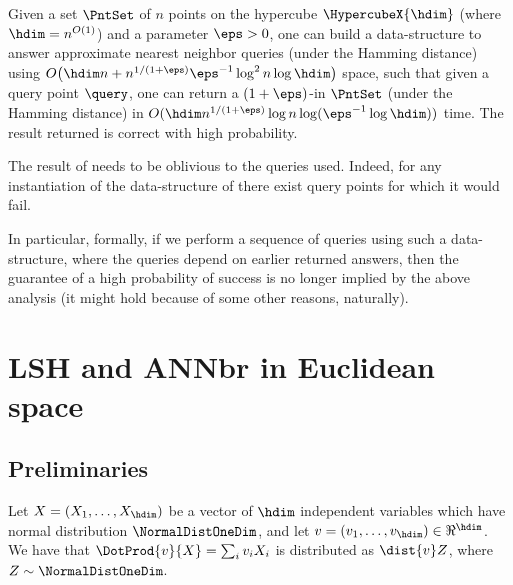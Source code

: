 \begin{theorem}
    Given a set $\PntSet$ of $n$ points on the hypercube
    $\HypercubeX{\hdim}$ (where $\hdim = n^{O(1)}$) and a parameter
    $\eps>0$, one can build a data-structure to answer approximate
    nearest neighbor queries (under the Hamming distance) using
    \begin{math}
        O\bigl( \hdim n + { n^{1/(1+\eps)}}\eps^{-1} \log^2 n \log
        \hdim \bigr)
    \end{math}
    space, such that given a query point $\query$, one can return
    a $(1+\eps)$-\ANNbr in $\PntSet$ (under the Hamming distance) in
    $O( \hdim n^{1/(1+\eps)} \log n \log (\eps^{-1} \log \hdim ) )$
    time. The result returned is correct with high probability.
\end{theorem}


\begin{remark}
    The result of  needs to be oblivious to
    the queries used. Indeed, for any instantiation of the
    data-structure of  there exist query
    points for which it would fail.

    In particular, formally, if we perform a sequence of \ANNbr
    queries using such a data-structure, where the queries depend on
    earlier returned answers, then the guarantee of a high probability
    of success is no longer implied by the above analysis (it might
    hold because of some other reasons, naturally).
\end{remark}




\section{LSH and ANN{}br in Euclidean space}

\subsection{Preliminaries}

\begin{lemma}
    Let $X= ( X_1,\ldots, X_\hdim)$ be a vector of $\hdim$ independent
    variables which have normal distribution $\NormalDistOneDim$, and
    let $v = (v_1,\ldots, v_\hdim) \in \Re^\hdim$. We have that
    $\DotProd{v}{X} = \sum_{i} v_i X_i$ is distributed as $\dist{v}
    Z$, where $Z \sim \NormalDistOneDim$.
\end{lemma}

